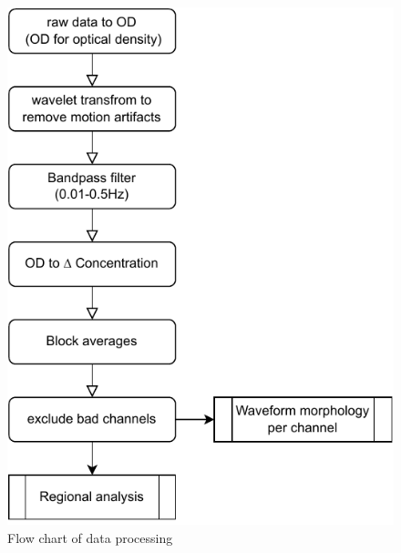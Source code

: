 \begin{figure}[H]
  \centering
    \includegraphics[scale=.9]{pdf/flowchart2.pdf}
  \caption{Flow chart of data processing}
  \label{fig:somesignal}
\end{figure}


